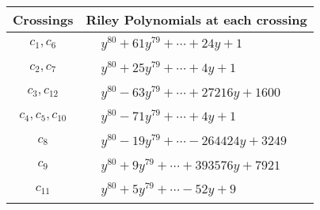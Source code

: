 \documentclass[1p]{elsarticle_modified}
\theoremstyle{definition}
\begin{document}
\begin{tabular}{m{50pt}|m{274pt}}
Crossings & \hspace{64pt}Riley Polynomials at each crossing \\
\hline $$\begin{aligned}c_{1},c_{6}\end{aligned}$$&$\begin{aligned}
&y^{80}+61 y^{79}+\cdots+24 y+1
\end{aligned}$\\
\hline $$\begin{aligned}c_{2},c_{7}\end{aligned}$$&$\begin{aligned}
&y^{80}+25 y^{79}+\cdots+4 y+1
\end{aligned}$\\
\hline $$\begin{aligned}c_{3},c_{12}\end{aligned}$$&$\begin{aligned}
&y^{80}-63 y^{79}+\cdots+27216 y+1600
\end{aligned}$\\
\hline $$\begin{aligned}c_{4},c_{5},c_{10}\end{aligned}$$&$\begin{aligned}
&y^{80}-71 y^{79}+\cdots+4 y+1
\end{aligned}$\\
\hline $$\begin{aligned}c_{8}\end{aligned}$$&$\begin{aligned}
&y^{80}-19 y^{79}+\cdots-264424 y+3249
\end{aligned}$\\
\hline $$\begin{aligned}c_{9}\end{aligned}$$&$\begin{aligned}
&y^{80}+9 y^{79}+\cdots+393576 y+7921
\end{aligned}$\\
\hline $$\begin{aligned}c_{11}\end{aligned}$$&$\begin{aligned}
&y^{80}+5 y^{79}+\cdots-52 y+9
\end{aligned}$\\
\hline
\end{tabular}
\vskip 2pc
\end{document}
